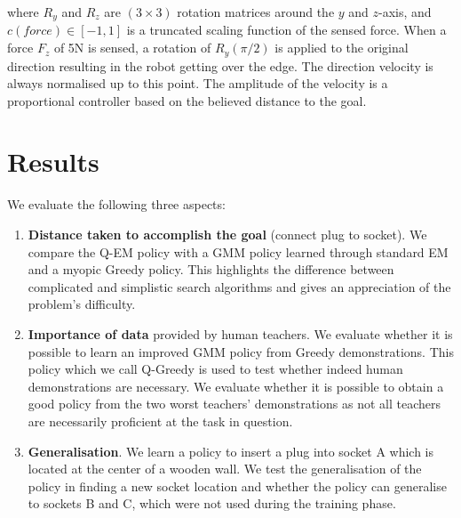 \documentclass[final,5p,times,twocolumn]{elsarticle}
\begin{document}
where $R_y$ and $R_z$ are $(3 \times 3)$ rotation matrices around the $y$ and $z$-axis, and $c(force) \in [-1,1]$ is a truncated scaling function of the sensed 
force.  When a force $F_z$ of 5N is sensed, a rotation of $R_y(\pi/2)$ is applied to the original direction resulting in the robot
getting over the edge. The direction velocity is always normalised up to this point. The amplitude of the velocity is a proportional
controller based on the believed distance to the goal. 

\section{Results}\label{sec:results}

We evaluate the following three aspects:
\begin{enumerate}
 \item \textbf{Distance taken to accomplish the goal} (connect plug to socket). We compare the Q-EM policy with 
 a GMM policy learned through standard EM and a myopic Greedy policy. This highlights the difference between complicated and simplistic  
  search algorithms and gives an appreciation of the problem's difficulty.
 \item \textbf{Importance of data} provided by human teachers. We evaluate whether it is possible to learn 
 an improved GMM policy from Greedy demonstrations. This policy which we call Q-Greedy is used to test whether 
 indeed human demonstrations are necessary. We evaluate whether it is possible to obtain a good policy from the two worst teachers' demonstrations as not all teachers 
 are necessarily proficient at the task in question. 
  \item \textbf{Generalisation}. We learn a policy to insert a plug into socket A which is located at the center of a wooden 
 wall. We test the generalisation of the policy in finding a new socket location and whether the policy can generalise to sockets 
 B and C, which were not used during the training phase.
\end{enumerate}
\end{document}
